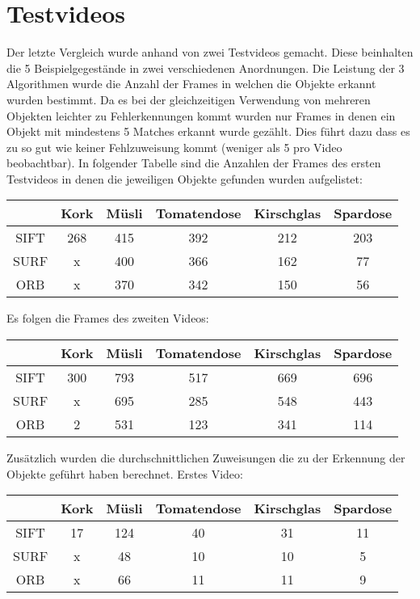 \section{Testvideos}

Der letzte Vergleich wurde anhand von zwei Testvideos gemacht.
Diese beinhalten die 5 Beispielgegestände in zwei verschiedenen Anordnungen.
Die Leistung der 3 Algorithmen wurde die Anzahl der Frames in welchen die Objekte erkannt wurden bestimmt.
Da es bei der gleichzeitigen Verwendung von mehreren Objekten leichter zu Fehlerkennungen kommt wurden nur Frames in denen ein Objekt mit mindestens 5 Matches erkannt wurde gezählt. 
Dies führt dazu dass es zu so gut wie keiner Fehlzuweisung kommt (weniger als 5 pro Video beobachtbar).
In folgender Tabelle sind die Anzahlen der Frames des ersten Testvideos in denen die jeweiligen Objekte gefunden wurden aufgelistet:

\begin{center}
    \begin{tabular}{ c | C | C | C | C | C |}
      & Kork & Müsli & Tomatendose & Kirschglas & Spardose \\ \hline
    SIFT & 268 & 415 & 392 & 212 & 203 \\ \hline
    SURF & x & 400 & 366 & 162 & 77 \\ \hline
    ORB & x & 370 & 342 & 150 & 56 \\
    \hline
    \end{tabular}
\end{center}

Es folgen die Frames des zweiten Videos:

\begin{center}
    \begin{tabular}{ c | C | C | C | C | C |}
      & Kork & Müsli & Tomatendose & Kirschglas & Spardose \\ \hline
    SIFT & 300 & 793 & 517 & 669 & 696 \\ \hline
    SURF & x & 695 & 285 & 548 & 443 \\ \hline
    ORB & 2 & 531 & 123 & 341 & 114 \\
    \hline
    \end{tabular}
\end{center}

Zusätzlich wurden die durchschnittlichen Zuweisungen die zu der Erkennung der Objekte geführt haben berechnet.
Erstes Video:

\begin{center}
    \begin{tabular}{ c | C | C | C | C | C |}
      & Kork & Müsli & Tomatendose & Kirschglas & Spardose \\ \hline
    SIFT & 17 & 124 & 40 & 31 & 11 \\ \hline
    SURF & x & 48 & 10 & 10 & 5 \\ \hline
    ORB & x & 66 & 11 & 11 & 9 \\
    \hline
    \end{tabular}
\end{center}

